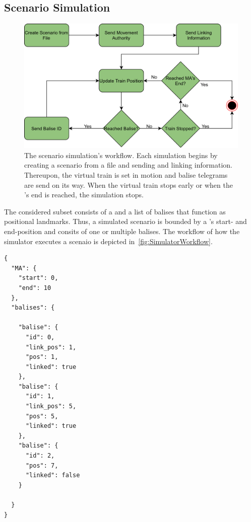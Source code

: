 \subsection{Scenario Simulation}
\label{subsec:ScenarioSimulation}

\begin{figure}[!hb]
	\centering
	\includegraphics[width=0.75\linewidth]{images/SimulatorWorkflow}
	\caption{The scenario simulation's workflow. Each simulation begins by creating a scenario from a file and sending  and linking information. Thereupon, the virtual train is set in motion and balise telegrams are send on its way. When the virtual train stops early or when the 's end is reached, the simulation stops.}
	\label{fig:SimulatorWorkflow}
\end{figure}

The considered  subset consists of a  and a list of balises that function as positional landmarks.
Thus, a simulated scenario is bounded by a 's start- and end-position and consits of one or multiple balises.
The workflow of how the simulator executes a scenaio is depicted in~\autoref{fig:SimulatorWorkflow}.

\begin{lstlisting}[caption={A JSON scenario representation. Each scenario consists of a \glsentryfull{MA} with a start and end point, as well as of a set of balises. Balises can be either linked or not and consist of an identification number, a linking position and an actual position. The linking position is transmitted to the on-board unit and is distinguished from its actual position to simulate a misplaced balise.}, label=code:scenarioJSON]
{
  "MA": {
    "start": 0,
    "end": 10
  },
  "balises": {

    "balise": {
      "id": 0,
      "link_pos": 1,
      "pos": 1,
      "linked": true
    },
    "balise": {
      "id": 1,
      "link_pos": 5,
      "pos": 5,
      "linked": true
    },
    "balise": {
      "id": 2,
      "pos": 7,
      "linked": false
    }

  }
}

\end{lstlisting}

